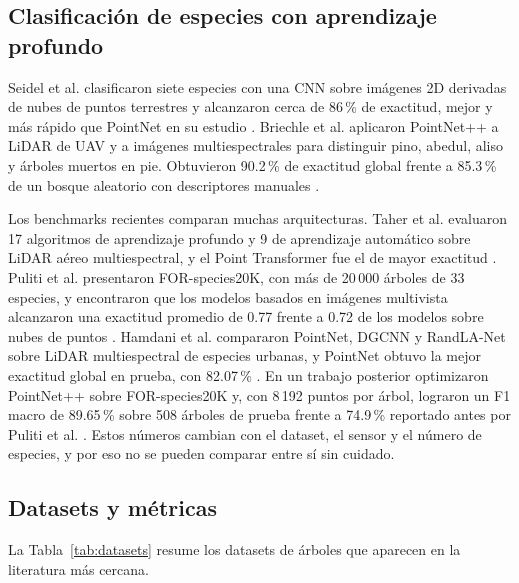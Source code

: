\documentclass[preprint,12pt]{elsarticle}
\begin{document}
\subsection{Clasificación de especies con aprendizaje profundo}

Seidel et al. clasificaron siete especies con una CNN sobre imágenes 2D derivadas de nubes de puntos terrestres y alcanzaron cerca de 86\,\% de exactitud, mejor y más rápido que PointNet en su estudio \cite{seidel2021species}. Briechle et al. aplicaron PointNet++ a LiDAR de UAV y a imágenes multiespectrales para distinguir pino, abedul, aliso y árboles muertos en pie. Obtuvieron 90.2\,\% de exactitud global frente a 85.3\,\% de un bosque aleatorio con descriptores manuales \cite{briechle2020pointnetpp}.

Los benchmarks recientes comparan muchas arquitecturas. Taher et al. evaluaron 17 algoritmos de aprendizaje profundo y 9 de aprendizaje automático sobre LiDAR aéreo multiespectral, y el Point Transformer fue el de mayor exactitud \cite{taher2025msals}. Puliti et al. presentaron FOR-species20K, con más de 20\,000 árboles de 33 especies, y encontraron que los modelos basados en imágenes multivista alcanzaron una exactitud promedio de 0.77 frente a 0.72 de los modelos sobre nubes de puntos \cite{puliti2025forspecies}. Hamdani et al. compararon PointNet, DGCNN y RandLA-Net sobre LiDAR multiespectral de especies urbanas, y PointNet obtuvo la mejor exactitud global en prueba, con 82.07\,\% \cite{hamdani2026classification}. En un trabajo posterior optimizaron PointNet++ sobre FOR-species20K y, con 8\,192 puntos por árbol, lograron un F1 macro de 89.65\,\% sobre 508 árboles de prueba frente a 74.9\,\% reportado antes por Puliti et al. \cite{hamdani2026optimisation}. Estos números cambian con el dataset, el sensor y el número de especies, y por eso no se pueden comparar entre sí sin cuidado.

\subsection{Datasets y métricas}

La Tabla~\ref{tab:datasets} resume los datasets de árboles que aparecen en la literatura más cercana.
\end{document}
